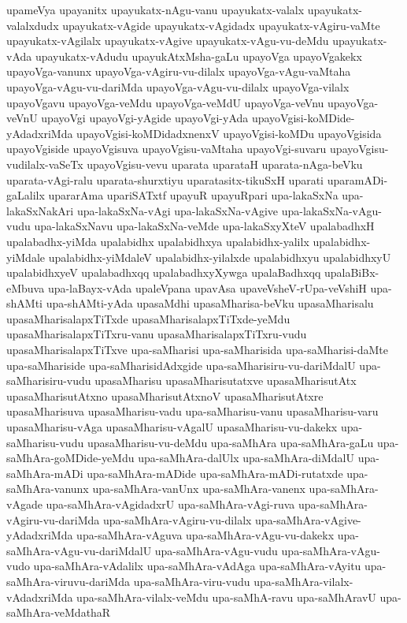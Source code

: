 {upameVya
upayanitx
upayukatx-nAgu-vanu
upayukatx-valalx
upayukatx-valalxdudx
upayukatx-vAgide
upayukatx-vAgidadx
upayukatx-vAgiru-vaMte
upayukatx-vAgilalx
upayukatx-vAgive
upayukatx-vAgu-vu-deMdu
upayukatx-vAda
upayukatx-vAdudu
upayukAtxMsha-gaLu
upayoVga
upayoVgakekx
upayoVga-vanunx
upayoVga-vAgiru-vu-dilalx
upayoVga-vAgu-vaMtaha
upayoVga-vAgu-vu-dariMda
upayoVga-vAgu-vu-dilalx
upayoVga-vilalx
upayoVgavu
upayoVga-veMdu
upayoVga-veMdU
upayoVga-veVnu
upayoVga-veVnU
upayoVgi
upayoVgi-yAgide
upayoVgi-yAda
upayoVgisi-koMDide-yAdadxriMda
upayoVgisi-koMDidadxnenxV
upayoVgisi-koMDu
upayoVgisida
upayoVgiside
upayoVgisuva
upayoVgisu-vaMtaha
upayoVgi-suvaru
upayoVgisu-vudilalx-vaSeTx
upayoVgisu-vevu
uparata
uparataH
uparata-nAga-beVku
uparata-vAgi-ralu
uparata-shurxtiyu
uparatasitx-tikuSxH
uparati
uparamADi-gaLalilx
upararAma
upariSATxtf
upayuR
upayuRpari
upa-lakaSxNa
upa-lakaSxNakAri
upa-lakaSxNa-vAgi
upa-lakaSxNa-vAgive
upa-lakaSxNa-vAgu-vudu
upa-lakaSxNavu
upa-lakaSxNa-veMde
upa-lakaSxyXteV
upalabadhxH
upalabadhx-yiMda
upalabidhx
upalabidhxya
upalabidhx-yalilx
upalabidhx-yiMdale
upalabidhx-yiMdaleV
upalabidhx-yilalxde
upalabidhxyu
upalabidhxyU
upalabidhxyeV
upalabadhxqq
upalabadhxyXywga
upalaBadhxqq
upalaBiBx-eMbuva
upa-laBayx-vAda
upaleVpana
upavAsa
upaveVsheV-rUpa-veVshiH
upa-shAMti
upa-shAMti-yAda
upasaMdhi
upasaMharisa-beVku
upasaMharisalu
upasaMharisalapxTiTxde
upasaMharisalapxTiTxde-yeMdu
upasaMharisalapxTiTxru-vanu
upasaMharisalapxTiTxru-vudu
upasaMharisalapxTiTxve
upa-saMharisi
upa-saMharisida
upa-saMharisi-daMte
upa-saMhariside
upa-saMharisidAdxgide
upa-saMharisiru-vu-dariMdalU
upa-saMharisiru-vudu
upasaMharisu
upasaMharisutatxve
upasaMharisutAtx
upasaMharisutAtxno
upasaMharisutAtxnoV
upasaMharisutAtxre
upasaMharisuva
upasaMharisu-vadu
upa-saMharisu-vanu
upasaMharisu-varu
upasaMharisu-vAga
upasaMharisu-vAgalU
upasaMharisu-vu-dakekx
upa-saMharisu-vudu
upasaMharisu-vu-deMdu
upa-saMhAra
upa-saMhAra-gaLu
upa-saMhAra-goMDide-yeMdu
upa-saMhAra-dalUlx
upa-saMhAra-diMdalU
upa-saMhAra-mADi
upa-saMhAra-mADide
upa-saMhAra-mADi-rutatxde
upa-saMhAra-vanunx
upa-saMhAra-vanUnx
upa-saMhAra-vanenx
upa-saMhAra-vAgade
upa-saMhAra-vAgidadxrU
upa-saMhAra-vAgi-ruva
upa-saMhAra-vAgiru-vu-dariMda
upa-saMhAra-vAgiru-vu-dilalx
upa-saMhAra-vAgive-yAdadxriMda
upa-saMhAra-vAguva
upa-saMhAra-vAgu-vu-dakekx
upa-saMhAra-vAgu-vu-dariMdalU
upa-saMhAra-vAgu-vudu
upa-saMhAra-vAgu-vudo
upa-saMhAra-vAdalilx
upa-saMhAra-vAdAga
upa-saMhAra-vAyitu
upa-saMhAra-viruvu-dariMda
upa-saMhAra-viru-vudu
upa-saMhAra-vilalx-vAdadxriMda
upa-saMhAra-vilalx-veMdu
upa-saMhA-ravu
upa-saMhAravU
upa-saMhAra-veMdathaR
}
